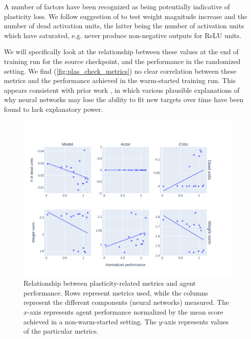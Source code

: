 \documentclass[en]{pracamgr}
\newcommand{\figurewidth}{\linewidth}
\newcommand{\figureheight}{0.8\paperheight}
\begin{document}
A number of factors have been recognized as being potentially indicative of plasticity loss. We follow suggestion of \autocite{julianiStudyPlasticityLoss2024} to test weight magnitude increase and the number of dead activation units, the latter being the number of activation units which have saturated, e.g. never produce non-negative outputs for ReLU units.

We will specifically look at the relationship between these values at the end of training run for the source checkpoint, and the performance in the randomized setting. We find (\autoref{fig:plas_check_metrics}) no clear correlation between these metrics and the performance achieved in the warm-started training run. This appears consistent with prior work \autocite{lyleUnderstandingPlasticityNeural2023}, in which various plausible explanations of why neural networks may lose the ability to fit new targets over time have been found to lack explanatory power.

\begin{figure}
  \centering
  \includegraphics[width=\figurewidth,height=\figureheight,keepaspectratio]{assets/plas_check.metrics.pdf}
  \caption{Relationship between plasticity-related metrics and agent performance. Rows represent metrics used, while the columns represent the different components (neural networks) measured. The $x$-axis represents agent performance normalized by the mean score achieved in a non-warm-started setting. The $y$-axis represents values of the particular metrics.}
  \label{fig:plas_check_metrics}
\end{figure}
\end{document}
